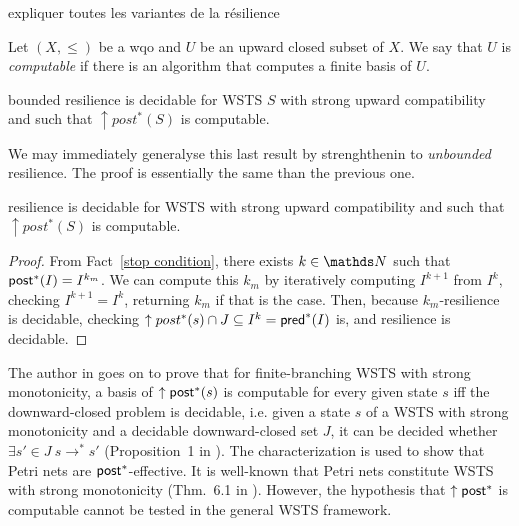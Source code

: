 expliquer toutes les variantes de la résilience


Let $(X,\leq)$ be a wqo and $U$ be an upward closed subset of $X$. We say that $U$ is \emph{computable} if there is an algorithm that computes a finite basis of $U$.


\begin{theorem}\cite{DBLP:conf/gg/Ozkan22,DBLP:journals/corr/abs-2108-00889}
{\sc bounded resilience} is decidable for WSTS $S$ with strong upward compatibility and such that $\uparrow post^*(S)$ is computable.
\end{theorem}

We may immediately generalyse this last result by strenghthenin to \emph{unbounded} resilience. The proof is essentially the same than the previous one.

\begin{corollary}\label{postcomputable}
{\sc resilience} is decidable for WSTS with strong upward compatibility and such that $\uparrow post^*(S)$ is computable.
\end{corollary}


\begin{proof}
From Fact~\ref{stop condition}, there exists $k \in \N$ such that
$\textsf{post}^*(I) = I^{k_m}$. We can compute this $k_m$ by iteratively computing
$I^{k+1}$ from $I^k$, checking $I^{k+1}=I^k$, 
returning $k_m$ if that is the case.
Then, because $k_m$-resilience is decidable, 
checking $\uparrow post^*(s) \cap J \subseteq I^k = \textsf{pred}^*(I)$ is,
and resilience is decidable.
\end{proof}

The author in \cite{DBLP:conf/gg/Ozkan22}
 goes on to prove that for finite-branching WSTS with strong monotonicity, a basis of $\uparrow \textsf{post}^*(s)$ is computable for every given state $s$ iff the downward-closed problem is decidable, i.e. given a state $s$ of a WSTS
with strong monotonicity 
and a decidable downward-closed set $J$, it can be decided whether $\exists s' \in J ~ s \to^* s'$ (Proposition~1 in \cite{DBLP:conf/gg/Ozkan22}). 
The characterization is used to show that Petri nets are $\textsf{post}^*$-effective. It is well-known that Petri nets constitute WSTS with strong monotonicity (Thm.~6.1 in \cite{DBLP:journals/tcs/FinkelS01}).
However, the hypothesis that $\uparrow \textsf{post}^*$ is computable cannot be tested in the general WSTS framework.

